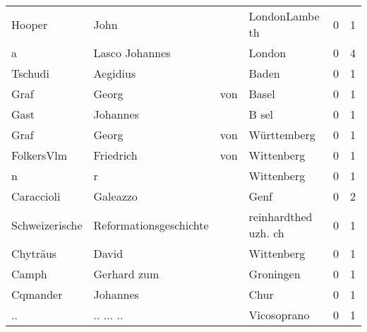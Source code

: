 \begin{center}
\begin{tiny}
\begin{longtabu}{llllrr}
                   Hooper &                               John &             &                              LondonLambe th &          0 &         1 \\
                        a &                     Lasco Johannes &             &                                      London &          0 &         4 \\
                  Tschudi &                           Aegidius &             &                                       Baden &          0 &         1 \\
                     Graf &                              Georg &         von &                                       Basel &          0 &         1 \\
                     Gast &                           Johannes &             &                                       B sel &          0 &         1 \\
                     Graf &                              Georg &         von &                                 Württemberg &          0 &         1 \\
               FolkersVlm &                          Friedrich &         von &                                  Wittenberg &          0 &         1 \\
                        n &                                  r &             &                                  Wittenberg &          0 &         1 \\
               Caraccioli &                           Galeazzo &             &                                        Genf &          0 &         2 \\
           Schweizerische &             Reformationsgeschichte &             &                        reinhardthed uzh. ch &          0 &         1 \\
                 Chyträus &                              David &             &                                  Wittenberg &          0 &         1 \\
                    Camph &                        Gerhard zum &             &                                   Groningen &          0 &         1 \\
                 Cqmander &                           Johannes &             &                                        Chur &          0 &         1 \\
                       .. &                          .. ... .. &             &                                 Vicosoprano &          0 &         1 \\

\end{longtabu}
\end{tiny}
\end{center}
